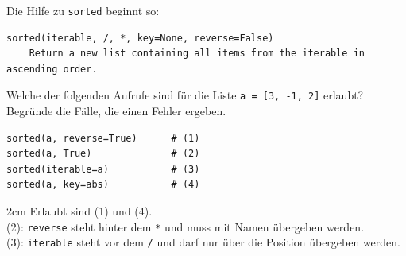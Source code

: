 \question[4]
Die Hilfe zu \texttt{sorted} beginnt so:
\begin{lstlisting}[language={}]
sorted(iterable, /, *, key=None, reverse=False)
    Return a new list containing all items from the iterable in ascending order.
\end{lstlisting}
Welche der folgenden Aufrufe sind für die Liste \texttt{a = [3, -1, 2]} erlaubt? Begründe die Fälle, die einen Fehler ergeben.
\begin{lstlisting}
sorted(a, reverse=True)      # (1)
sorted(a, True)              # (2)
sorted(iterable=a)           # (3)
sorted(a, key=abs)           # (4)
\end{lstlisting}
\begin{solutionbox}{2cm}
Erlaubt sind (1) und (4). \\
(2): \texttt{reverse} steht hinter dem \texttt{*} und muss mit Namen übergeben werden. \\
(3): \texttt{iterable} steht vor dem \texttt{/} und darf nur über die Position übergeben werden.
\end{solutionbox}
